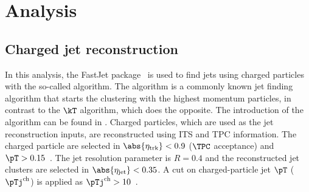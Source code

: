 \documentclass[ALICE,manyauthors]{cernphprep}
\begin{document}

\section{Analysis}%
\label{sec:Analysis}

\subsection{Charged jet reconstruction}%
\label{sec:JetRec}

In this analysis, the FastJet package~\cite{Cacciari:2011ma} is used to find jets using charged particles with the so-called \akT algorithm.
The \akT algorithm is a commonly known jet finding algorithm that starts the clustering with the highest momentum particles, in contrast to the $\kT$ algorithm, which does the opposite.
The introduction of the algorithm can be found in \cite{Cacciari:2008gp}.
Charged particles, which are used as the jet reconstruction inputs, are reconstructed using ITS and TPC information.
The charged particle are selected in $\abs{\eta_{\rm trk}} < 0.9$ ($\TPC$ acceptance) and $\pT> 0.15$~\GeVc.
The jet resolution parameter is $R = 0.4$ and the reconstructed jet clusters are selected in $\abs{\eta_{\rm jet}} < 0.35$.
A cut on charged-particle jet $\pT$ ($\pTj^{\rm ch}$) is applied as $\pTj^{\rm ch} > 10$~\GeVc.
\end{document}
